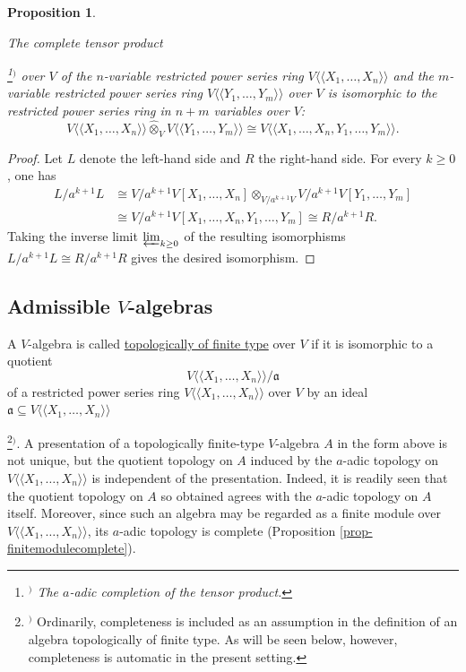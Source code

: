 \documentclass[a4paper,12pt, dvipdfmx]{jsbook}
\def\dl{\langle\!\langle}
\def\dr{\rangle\!\rangle}
\theoremstyle{plain}
\newtheorem{prop}[thm]{\bfseries Proposition}
\theoremstyle{definition}
\newcounter{chushaku}
\def\chu#1{\addtocounter{chushaku}{1}\footnote[\value{chushaku}]{${}^)$ #1}${}^)$}
\begin{document}
\begin{prop}\label{prop-completetensorproductrestrictedpowerseriesrings}{\rm 
The complete tensor product\chu{The $a$-adic completion of the tensor product.} over $V$ of the $n$-variable restricted power series ring $V\dl X_1,\ldots,X_n\dr$ and the $m$-variable restricted power series ring $V\dl Y_1,\ldots,Y_m\dr$ over $V$ is isomorphic to the restricted power series ring in $n+m$ variables over $V$:
$$
V\dl X_1,\ldots,X_n\dr\widehat{\otimes}_VV\dl Y_1,\ldots,Y_m\dr\cong V\dl X_1,\ldots,X_n,Y_1,\ldots,Y_m\dr.
$$}
\end{prop}

\begin{proof}[Proof]
Let $L$ denote the left-hand side and $R$ the right-hand side.
For every $k\geq 0$, one has
\begin{equation*}
\begin{split}
L/a^{k+1}L&\cong V/a^{k+1}V[X_1,\ldots,X_n]\otimes_{V/a^{k+1}V}V/a^{k+1}V[Y_1,\ldots,Y_m]\\
&\cong V/a^{k+1}V[X_1,\ldots,X_n,Y_1,\ldots,Y_m]\cong R/a^{k+1}R.
\end{split}
\end{equation*}
Taking the inverse limit $\varprojlim_{k\geq 0}$ of the resulting isomorphisms $L/a^{k+1}L\cong R/a^{k+1}R$ gives the desired isomorphism.
\end{proof}

\subsection{Admissible $V$-algebras}\label{sub-topologicalfinitetypealgebras}
A $V$-algebra is called \underline{topologically of finite type} over $V$ if it is isomorphic to a quotient
$$
V\dl X_1,\ldots,X_n\dr/\mathfrak{a}
$$
of a restricted power series ring $V\dl X_1,\ldots,X_n\dr$ over $V$ by an ideal $\mathfrak{a}\subseteq V\dl X_1,\ldots,X_n\dr$\chu{Ordinarily, completeness is included as an assumption in the definition of an algebra topologically of finite type. As will be seen below, however, completeness is automatic in the present setting.}.
A presentation of a topologically finite-type $V$-algebra $A$ in the form above is not unique, but the quotient topology on $A$ induced by the $a$-adic topology on $V\dl X_1,\ldots,X_n\dr$ is independent of the presentation.
Indeed, it is readily seen that the quotient topology on $A$ so obtained agrees with the $a$-adic topology on $A$ itself.
Moreover, since such an algebra may be regarded as a finite module over $V\dl X_1,\ldots,X_n\dr$, its $a$-adic topology is complete (Proposition \ref{prop-finitemodulecomplete}).
\end{document}
